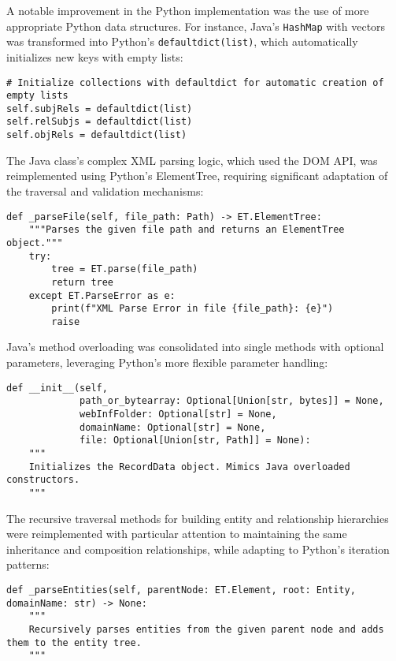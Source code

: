 \documentclass[12pt,a4paper]{article}
\begin{document}
A notable improvement in the Python implementation was the use of more appropriate Python data structures. For instance, Java's \texttt{HashMap} with vectors was transformed into Python's \texttt{defaultdict(list)}, which automatically initializes new keys with empty lists:

\begin{verbatim}
# Initialize collections with defaultdict for automatic creation of empty lists
self.subjRels = defaultdict(list)
self.relSubjs = defaultdict(list)
self.objRels = defaultdict(list)
\end{verbatim}

The Java class's complex XML parsing logic, which used the DOM API, was reimplemented using Python's ElementTree, requiring significant adaptation of the traversal and validation mechanisms:

\begin{verbatim}
def _parseFile(self, file_path: Path) -> ET.ElementTree:
    """Parses the given file path and returns an ElementTree object."""
    try:
        tree = ET.parse(file_path)
        return tree
    except ET.ParseError as e:
        print(f"XML Parse Error in file {file_path}: {e}")
        raise
\end{verbatim}

Java's method overloading was consolidated into single methods with optional parameters, leveraging Python's more flexible parameter handling:

\begin{verbatim}
def __init__(self,
             path_or_bytearray: Optional[Union[str, bytes]] = None,
             webInfFolder: Optional[str] = None,
             domainName: Optional[str] = None,
             file: Optional[Union[str, Path]] = None):
    """
    Initializes the RecordData object. Mimics Java overloaded constructors.
    """
\end{verbatim}

The recursive traversal methods for building entity and relationship hierarchies were reimplemented with particular attention to maintaining the same inheritance and composition relationships, while adapting to Python's iteration patterns:

\begin{verbatim}
def _parseEntities(self, parentNode: ET.Element, root: Entity, domainName: str) -> None:
    """
    Recursively parses entities from the given parent node and adds them to the entity tree.
    """
\end{verbatim}
\end{document}
